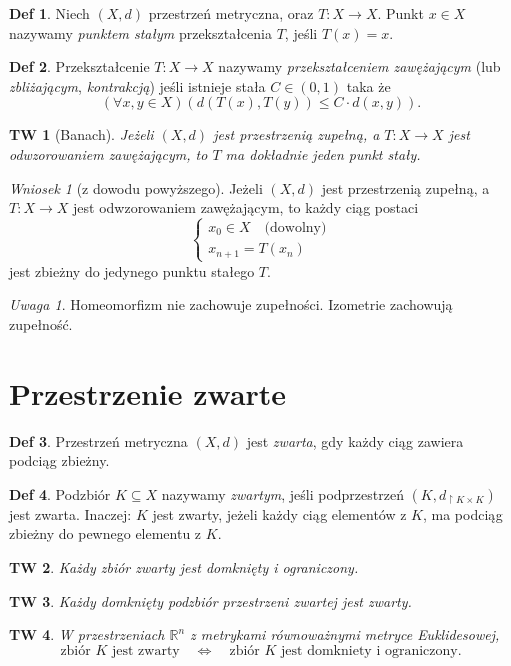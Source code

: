 \documentclass[a4paper, 12pt]{mwart}
\theoremstyle{definition}
\newtheorem{definicja}{Def}[section]
\theoremstyle{plain}
\newtheorem{twierdzenie}{TW}[section]
\theoremstyle{remark}
\newtheorem{wniosek}{Wniosek}[section]
\newtheorem*{uwaga}{Uwaga}
\begin{document}
\begin{definicja}
	Niech $(X, d)$ \ppauza przestrzeń metryczna, oraz $T \colon X \to X$.
	Punkt $x \in X$ nazywamy \emph{punktem stałym} przekształcenia $T$, jeśli $T(x) = x$.
\end{definicja}
\begin{definicja}
	Przekształcenie $T \colon X \to X$ nazywamy \emph{przekształceniem zawężającym} (lub \emph{zbliżającym}, \emph{kontrakcją}) jeśli istnieje stała $C \in (0, 1)$ taka że
	\begin{equation}
		\left(\forall x, y \in X\right)\left(d(T(x), T(y)) \leq C \cdot d(x, y)\right).
	\end{equation}
\end{definicja}
\begin{twierdzenie}[Banach]
	Jeżeli  $(X, d)$ jest przestrzenią zupełną, a $T \colon X \to X$ jest odwzorowaniem zawężającym, to $T$ ma dokładnie jeden punkt stały.
\end{twierdzenie}
\begin{wniosek}[z dowodu powyższego]
	Jeżeli  $(X, d)$ jest przestrzenią zupełną, a $T \colon X \to X$ jest odwzorowaniem zawężającym, to każdy ciąg postaci
	\begin{equation}
		\begin{cases}
			x_0 \in X \quad \text{(dowolny)}\\
			x_{n+1} = T(x_n)
		\end{cases}
	\end{equation}
	jest zbieżny do jedynego punktu stałego $T$.
\end{wniosek}
\begin{uwaga}
	Homeomorfizm nie zachowuje zupełności. Izometrie zachowują zupełność.
\end{uwaga}
\section{Przestrzenie zwarte}
\begin{definicja}
	Przestrzeń metryczna $(X, d)$ jest \emph{zwarta}, gdy każdy ciąg zawiera podciąg zbieżny.
\end{definicja}
\begin{definicja}
	Podzbiór $K \subseteq X$ nazywamy \emph{zwartym}, jeśli podprzestrzeń $(K, d_{\restriction K \times K})$ jest zwarta. Inaczej: $K$ jest zwarty, jeżeli każdy ciąg elementów z $K$, ma podciąg zbieżny do pewnego elementu z $K$.
\end{definicja}
\begin{twierdzenie}
	Każdy zbiór zwarty jest domknięty i ograniczony.
\end{twierdzenie}
\begin{twierdzenie}
	Każdy domknięty podzbiór przestrzeni zwartej jest zwarty.
\end{twierdzenie}
\begin{twierdzenie}
	W przestrzeniach $\mathbb{R}^n$ z metrykami równoważnymi metryce Euklidesowej,
	\begin{equation}
		\text{zbiór } K \text{ jest zwarty} \quad \iff \quad \text{zbiór } K \text{ jest domkniety i ograniczony}.
	\end{equation}
\end{twierdzenie}
\end{document}
